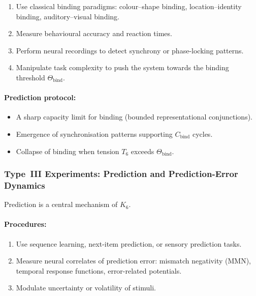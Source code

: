\begin{enumerate}
    \item Use classical binding paradigms:
          colour–shape binding, location–identity binding,
          auditory–visual binding.
    \item Measure behavioural accuracy and reaction times.
    \item Perform neural recordings to detect synchrony or
          phase-locking patterns.
    \item Manipulate task complexity to push the system towards
          the binding threshold $\Theta_{\mathrm{bind}}$.
\end{enumerate}

\paragraph{Prediction protocol:}

\begin{itemize}
    \item A sharp capacity limit for binding
          (bounded representational conjunctions).
    \item Emergence of synchronisation patterns supporting
          $C_{\mathrm{bind}}$ cycles.
    \item Collapse of binding when tension $T_6$ exceeds
          $\Theta_{\mathrm{bind}}$.
\end{itemize}



\subsubsection{Type~III Experiments: Prediction and Prediction-Error Dynamics}

Prediction is a central mechanism of $K_6$.

\paragraph{Procedures:}

\begin{enumerate}
    \item Use sequence learning, next-item prediction,
          or sensory prediction tasks.
    \item Measure neural correlates of prediction error:
          mismatch negativity (MMN), temporal response functions,
          error-related potentials.
    \item Modulate uncertainty or volatility of stimuli.
\end{enumerate}

